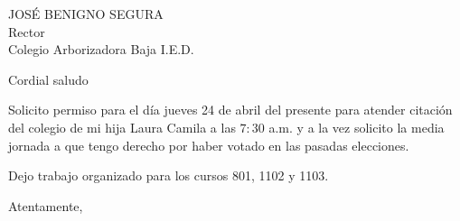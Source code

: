 \documentclass[letterpaper,spanish,11pt]{letter}
\begin{document}
\begin{letter}{JOSÉ BENIGNO SEGURA\\Rector\\Colegio Arborizadora Baja I.E.D.}
	
\opening{Cordial saludo}

Solicito permiso para el día jueves 24 de abril del presente para atender citación del colegio de mi hija Laura Camila a las $7:30$ a.m. y a la vez solicito la media jornada a que tengo derecho por haber votado en las pasadas elecciones.

Dejo trabajo organizado para los cursos 801, 1102 y 1103.

\closing{Atentamente,}


\end{letter}
\end{document}
